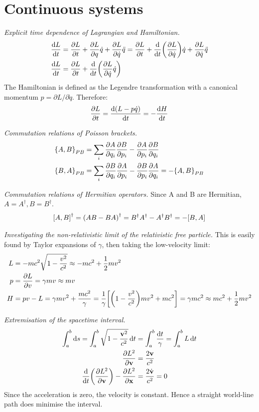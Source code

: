 \documentclass{report}
\begin{document}
\chapter{Continuous systems}

\begin{subquests}
	\item \emph{Explicit time dependence of Lagrangian and Hamiltonian.}
	\begin{align*}
		\dv{L}{t} & = \pdv{L}{t} + \pdv{L}{q}\dot{q} + \pdv{L}{\dot{q}}\ddot{q} = \pdv{L}{t} + \dv{t}\pqty{\pdv{L}{\dot{q}}}\dot{q} + \pdv{L}{\dot{q}}\ddot{q} \\
		\dv{L}{t} & = \pdv{L}{t} + \dv{t}\pqty{\pdv{L}{\dot{q}}\dot{q}}
	\end{align*}
	The Hamiltonian is defined as the Legendre transformation with a canonical momentum $p = \partial{L}/\partial{\dot q}$. Therefore: 
	\begin{gather*}
		\pdv{L}{t} = \dv{\pqty{L - p\dot{q}}}{t} = -\dv{H}{t}  
	\end{gather*}
	\item \emph{Commutation relations of Poisson brackets.}
	\begin{align*}
		\qty{A,B}_{PB} & = \sum_i \pdv{A}{q_i}\pdv{B}{p_i} - \pdv{A}{p_i}\pdv{B}{q_i} \\
		\qty{B,A}_{PB} & = \sum_i \pdv{B}{q_i}\pdv{A}{p_i} - \pdv{B}{p_i}\pdv{A}{q_i} = -\qty{A,B}_{PB}
	\end{align*}
	\item \emph{Commutation relations of Hermitian operators.} Since A and B are Hermitian, $A = A^{\dagger}, B = B^{\dagger}$.
	\begin{gather*}
		\bqty{A,B}^{\dagger} = \pqty{AB - BA}^{\dagger} = B^{\dagger}A^{\dagger} - A^{\dagger}B^{\dagger} = -\bqty{B,A}
	\end{gather*}
	\item \emph{Investigating the non-relativistic limit of the relativistic free particle.} This is easily found by Taylor expansions of $\gamma$, then taking the low-velocity limit:
	\begin{align*}
		L & = -mc^2 \sqrt{1 - \frac{v^2}{c^2}} \approx -mc^2 + \frac{1}{2}mv^2 \\
		p & = \pdv{L}{v} = \gamma mv \approx mv \\
		H & = pv - L = \gamma mv^2 + \frac{mc^2}{\gamma} = \frac{1}{\gamma}\bqty{\pqty{1 - \frac{v^2}{c^2}}mv^2 + mc^2} = \gamma mc^2 \approx mc^2 + \frac{1}{2}mv^2	
	\end{align*}
	\item \emph{Extremisation of the spacetime interval.}
	\begin{align*}
		\int_a^b \dd{s} = \int_a^b \sqrt{1-\frac{{\vb v}^2}{c^2}} \dd{t} & = \int_a^b \frac{\dd{t}}{\gamma} = \int_a^b L \dd{t} \\
		\pdv{L^2}{\vb v} & = \frac{2\vb v}{c^2} \\
		\dv{t}\pqty{\pdv{L^2}{\vb v}} - \pdv{L^2}{\vb x} & = \frac{2\dot{\vb v}}{c^2} = 0
	\end{align*}
	Since the acceleration is zero, the velocity is constant. Hence a straight world-line path does minimise the interval.


\end{subquests}
\end{document}

